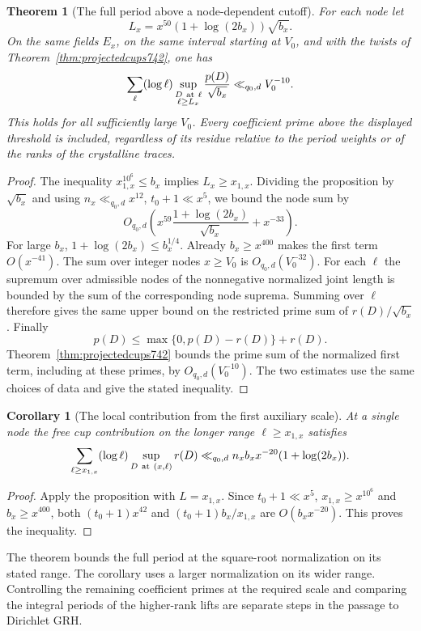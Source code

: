 \documentclass[a4paper,11pt]{article}
\newtheorem{theorem}[proposition]{Theorem}
\newtheorem{corollary}[proposition]{Corollary}
\theoremstyle{definition}
\theoremstyle{remark}
\numberwithin{equation}{section}
\begin{document}
\begin{theorem}[The full period above a node-dependent cutoff]
\leavevmode\label{thm:fullperiodcutoff769}
For each node let
\[
          L_x=x^{50}(1+\log(2b_x))\sqrt{b_x}.
\]
On the same fields \(E_x\), on the same interval starting
at \(V_0\), and with the twists of
Theorem~\ref{thm:projectedcups742}, one has
\[
  \sum_\ell(\log\ell)
       \sup_{\substack{D\ {\rm at}\ \ell\\ \ell\ge L_x}}
                  \frac{p(D)}{\sqrt{b_x}}
       \ll_{q_0,d} V_0^{-10}.
\]
This holds for all sufficiently large \(V_0\). Every
coefficient prime above the displayed threshold is included,
regardless of its residue relative to the period weights
or of the ranks of the crystalline traces.
\end{theorem}
\begin{proof}
The inequality \(x_{1,x}^{10^6}\le b_x\) implies
\(L_x\ge x_{1,x}\). Dividing the proposition by \(\sqrt{b_x}\)
and using \(n_x\ll_{q_0,d}x^{12}\), \(t_0+1\ll x^5\),
we bound the node sum by
\[
 O_{q_0,d}\!\left(
    x^{59}\frac{1+\log(2b_x)}{\sqrt{b_x}}+x^{-33}\right).
\]
For large \(b_x\), \(1+\log(2b_x)\le b_x^{1/4}\).
Already \(b_x\ge x^{400}\) makes the first term
\(O(x^{-41})\). The sum over integer nodes \(x\ge V_0\)
is \(O_{q_0,d}(V_0^{-32})\). For each \(\ell\) the
supremum over admissible nodes of the nonnegative normalized
joint length is bounded by the sum of the corresponding
node suprema. Summing over \(\ell\) therefore gives the
same upper bound on the restricted prime sum of
\(r(D)/\sqrt{b_x}\). Finally
\[
             p(D)\le \max\{0,p(D)-r(D)\}+r(D).
\]
Theorem~\ref{thm:projectedcups742} bounds the prime sum
of the normalized first term, including at these primes,
by \(O_{q_0,d}(V_0^{-10})\). The two estimates use the
same choices of data and give the stated inequality.
\end{proof}

\begin{corollary}[The local contribution from the first auxiliary scale]
\leavevmode\label{cor:firstauxiliarytail769}
At a single node the free cup contribution on the longer
range \(\ell\ge x_{1,x}\) satisfies
\[
 \sum_{\ell\ge x_{1,x}}(\log\ell)
         \sup_{D\ {\rm at}\ (x,\ell)}r(D)
   \ll_{q_0,d} n_x b_x x^{-20}(1+\log(2b_x)).
\]
\end{corollary}
\begin{proof}
Apply the proposition with \(L=x_{1,x}\). Since
\(t_0+1\ll x^5\), \(x_{1,x}\ge x^{10^6}\) and
\(b_x\ge x^{400}\), both
\((t_0+1)x^{42}\) and \((t_0+1)b_x/x_{1,x}\)
are \(O(b_x x^{-20})\). This proves the inequality.
\end{proof}
The theorem bounds the full period at the square-root
normalization on its stated range. The corollary uses a
larger normalization on its wider range. Controlling the
remaining coefficient primes at the required scale and
comparing the integral periods of the higher-rank lifts
are separate steps in the passage to Dirichlet GRH.
\clearpage
\end{document}
